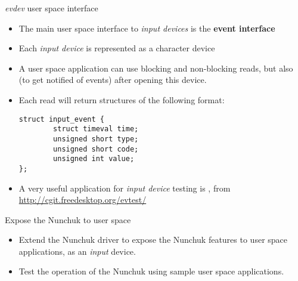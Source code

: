 \begin{frame}[fragile]{{\em evdev} user space interface}
  \begin{itemize}
  \item The main user space interface to {\em input devices} is the
    {\bf event interface}
  \item Each {\em input device} is represented as a
     character device
  \item A user space application can use blocking and non-blocking
    reads, but also  (to get notified of events) after
    opening this device.
  \item Each read will return  structures of the
    following format:
    \begin{block}{}
    \begin{verbatim}
struct input_event {
        struct timeval time;
        unsigned short type;
        unsigned short code;
        unsigned int value;
};
\end{verbatim}
\end{block}
\item A very useful application for {\em input device} testing is
  , from \url{http://cgit.freedesktop.org/evtest/}
  \end{itemize}
\end{frame}

\setuplabframe
{Expose the Nunchuk to user space}
{
  \begin{itemize}
  \item Extend the Nunchuk driver to expose the Nunchuk features to
    user space applications, as an {\em input} device.
  \item Test the operation of the Nunchuk using sample user space
    applications.
  \end{itemize}
}
